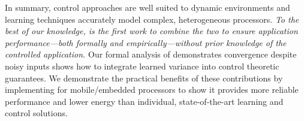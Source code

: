 In summary, control approaches are well suited to dynamic environments
and learning techniques accurately model complex, heterogeneous
processors.  \emph{To the best of our knowledge, \SYSTEM{} is the
  first work to combine the two to ensure application
  performance---both formally and empirically---without prior
  knowledge of the controlled application.}  Our formal analysis of
\SYSTEM{} demonstrates convergence despite noisy inputs shows how to
integrate learned variance into control theoretic guarantees.  We
demonstrate the practical benefits of these contributions by
implementing \SYSTEM{} for mobile/embedded processors to show it
provides more reliable performance and lower energy than individual,
state-of-the-art learning and control solutions.



